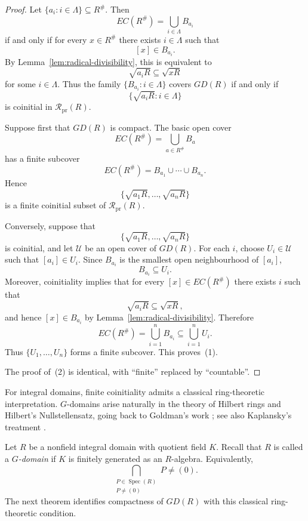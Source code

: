 \documentclass[11pt]{amsart}
\theoremstyle{plain}
\theoremstyle{definition}
\theoremstyle{remark}
\numberwithin{equation}{section}
\begin{document}
\begin{proof}
	Let $\{a_i:i\in\Lambda\}\subseteq R^\#$. Then
	\[
	EC(R^\#)=\bigcup_{i\in\Lambda}B_{a_i}
	\]
	if and only if for every $x\in R^\#$ there exists $i\in\Lambda$ such
	that
	\[
	[x]\in B_{a_i}.
	\]
	By Lemma~\ref{lem:radical-divisibility}, this is equivalent to
	\[
	\sqrt{a_iR}\subseteq\sqrt{xR}
	\]
	for some $i\in\Lambda$. Thus the family
	$\{B_{a_i}:i\in\Lambda\}$ covers $GD(R)$ if and only if
	\[
	\{\sqrt{a_iR}:i\in\Lambda\}
	\]
	is coinitial in $\mathcal R_{\mathrm{pr}}(R)$.
	
	Suppose first that $GD(R)$ is compact. The basic open cover
	\[
	EC(R^\#)=\bigcup_{a\in R^\#}B_a
	\]
	has a finite subcover
	\[
	EC(R^\#)
	=
	B_{a_1}\cup\cdots\cup B_{a_n}.
	\]
	Hence
	\[
	\{\sqrt{a_1R},\ldots,\sqrt{a_nR}\}
	\]
	is a finite coinitial subset of $\mathcal R_{\mathrm{pr}}(R)$.
	
Conversely, suppose that
\[
\{\sqrt{a_1R},\ldots,\sqrt{a_nR}\}
\]
is coinitial, and let $\mathcal U$ be an open cover of $GD(R)$.
For each $i$, choose $U_i\in\mathcal U$ such that $[a_i]\in U_i$.
Since $B_{a_i}$ is the smallest open neighbourhood of $[a_i]$,
\[
B_{a_i}\subseteq U_i.
\]
Moreover, coinitiality implies that for every $[x]\in EC(R^\#)$
there exists $i$ such that
\[
\sqrt{a_iR}\subseteq\sqrt{xR},
\]
and hence $[x]\in B_{a_i}$ by
Lemma~\ref{lem:radical-divisibility}. Therefore
\[
EC(R^\#)=\bigcup_{i=1}^n B_{a_i}
\subseteq
\bigcup_{i=1}^n U_i.
\]
Thus $\{U_1,\ldots,U_n\}$ forms a finite subcover. This proves~(1).
	
	The proof of~(2) is identical, with ``finite'' replaced by
	``countable''.
\end{proof}


For integral domains, finite coinitiality admits a classical
ring-theoretic interpretation. $G$-domains arise naturally in the
theory of Hilbert rings and Hilbert's Nullstellensatz, going back to
Goldman's work \cite{Goldman}; see also Kaplansky's treatment
\cite{Kaplansky}.

Let $R$ be a nonfield integral domain with quotient field $K$. Recall
that $R$ is called a \emph{$G$-domain} if $K$ is finitely generated as
an $R$-algebra. Equivalently,
\[
\bigcap_{\substack{P\in\operatorname{Spec}(R)\\P\neq(0)}}P
\neq(0).
\]
The next theorem identifies compactness of $GD(R)$ with this classical
ring-theoretic condition.
\end{document}

